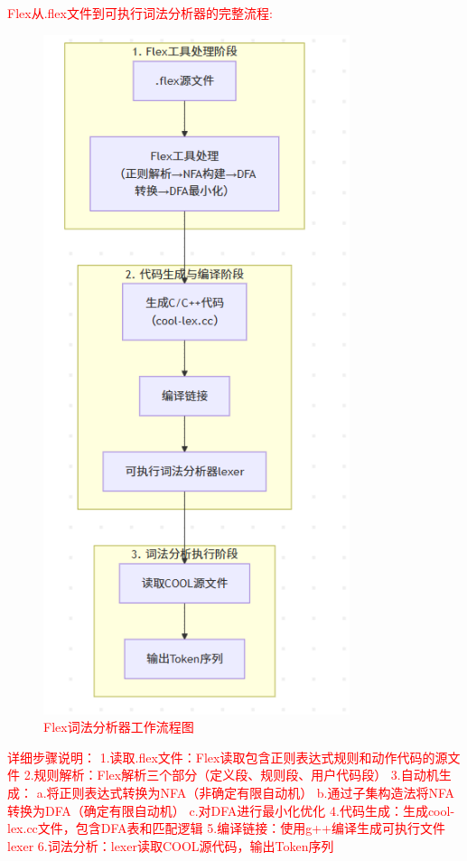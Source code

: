 \documentclass[twocolumn]{article}
\begin{document}
\textcolor{red}{%
Flex从.flex文件到可执行词法分析器的完整流程:
\begin{figure}[htbp]
    \centering
    \includegraphics[width=0.8\textwidth]{Flex_work.png}
    \caption{Flex词法分析器工作流程图}
    \label{fig:flex_workflow}
\end{figure}
详细步骤说明：
1.读取.flex文件：Flex读取包含正则表达式规则和动作代码的源文件
2.规则解析：Flex解析三个部分（定义段、规则段、用户代码段）
3.自动机生成：
    a.将正则表达式转换为NFA（非确定有限自动机）
    b.通过子集构造法将NFA转换为DFA（确定有限自动机）
    c.对DFA进行最小化优化
4.代码生成：生成cool-lex.cc文件，包含DFA表和匹配逻辑
5.编译链接：使用g++编译生成可执行文件lexer
6.词法分析：lexer读取COOL源代码，输出Token序列
}
\end{document}
